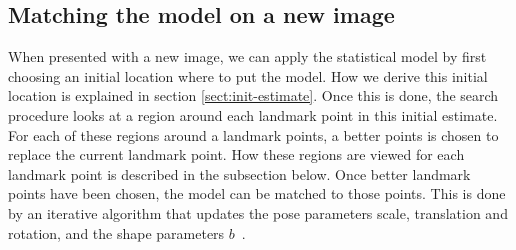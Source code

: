 \documentclass[a4paper]{article}
\begin{document}
\subsection{Matching the model on a new image}
When presented with a new image, we can apply the statistical model by first choosing an initial location where to put the model. 
How we derive this initial location is explained in section \ref{sect:init-estimate}.
Once this is done, the search procedure looks at a region around each landmark point in this initial estimate.
For each of these regions around a landmark points, a better points is chosen to replace the current landmark point.
How these regions are viewed for each landmark point is described in the subsection below.
Once better landmark points have been chosen, the model can be matched to those points.
This is done by an iterative algorithm that updates the pose parameters scale, translation and rotation, and the shape parameters $b$~\cite{Cootes1992AnIT}.
\end{document}
